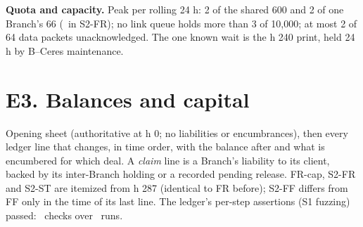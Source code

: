 \textbf{Quota and capacity.} Peak per rolling 24 h: 2 of the shared 600 and 2 of one Branch's 66 (\SimSTwoPeakBranch\ in S2-FR); no link queue holds more than 3 of 10{,}000; at most 2 of 64 data packets unacknowledged. The one known wait is the h 240 print, held 24 h by B--Ceres maintenance.

\section*{E3. Balances and capital}

Opening sheet (authoritative at h 0; no liabilities or encumbrances), then every ledger line that changes, in time order, with the balance after
and what is encumbered for which deal. A \emph{claim} line is a Branch's liability to its client, backed by its inter-Branch holding or a recorded
pending release. FR-cap, S2-FR and S2-ST are itemized from h 287 (identical to FR before); S2-FF differs from FF only in the time of its last
line. The ledger's per-step assertions (S1 fuzzing) passed: \SimChecks\ checks over \SimRuns\ runs.


